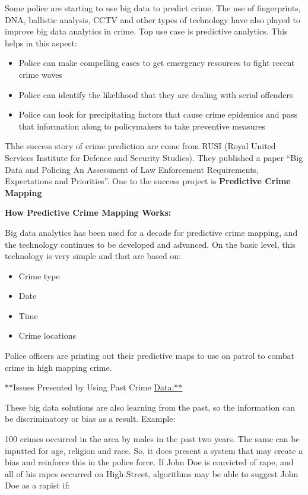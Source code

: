\documentclass[]{book}
\providecommand{\tightlist}{%
  \setlength{\itemsep}{0pt}\setlength{\parskip}{0pt}}
\begin{document}
Some police are starting to use big data to predict crime. The use of
fingerprints, DNA, ballistic analysis, CCTV and other types of
technology have also played to improve big data analytics in crime. Top
use case is predictive analytics. This helps in this aspect:

\begin{itemize}
\tightlist
\item
  Police can make compelling cases to get emergency resources to fight
  recent crime waves
\item
  Police can identify the likelihood that they are dealing with serial
  offenders
\item
  Police can look for precipitating factors that cause crime epidemics
  and pass that information along to policymakers to take preventive
  measures
\end{itemize}

Thhe success story of crime prediction are come from RUSI (Royal United
Services Institute for Defence and Security Studies). They published a
paper ``Big Data and Policing An Assessment of Law Enforcement
Requirements, Expectations and Priorities''. One to the success project
is \textbf{Predictive Crime Mapping}

\textbf{How Predictive Crime Mapping Works:}

Big data analytics has been used for a decade for predictive crime
mapping, and the technology continues to be developed and advanced. On
the basic level, this technology is very simple and that are based on:

\begin{itemize}
\tightlist
\item
  Crime type
\item
  Date
\item
  Time
\item
  Crime locations
\end{itemize}

Police officers are printing out their predictive maps to use on patrol
to combat crime in high mapping crime.

**Issues Presented by Using Past Crime \url{Data:**}

These big data solutions are also learning from the past, so the
information can be discriminatory or bias as a result. Example:

100 crimes occurred in the area by males in the past two years. The same
can be inputted for age, religion and race. So, it does present a system
that may create a bias and reinforce this in the police force. If John
Doe is convicted of rape, and all of his rapes occurred on High Street,
algorithms may be able to suggest John Doe as a rapist if:
\end{document}
